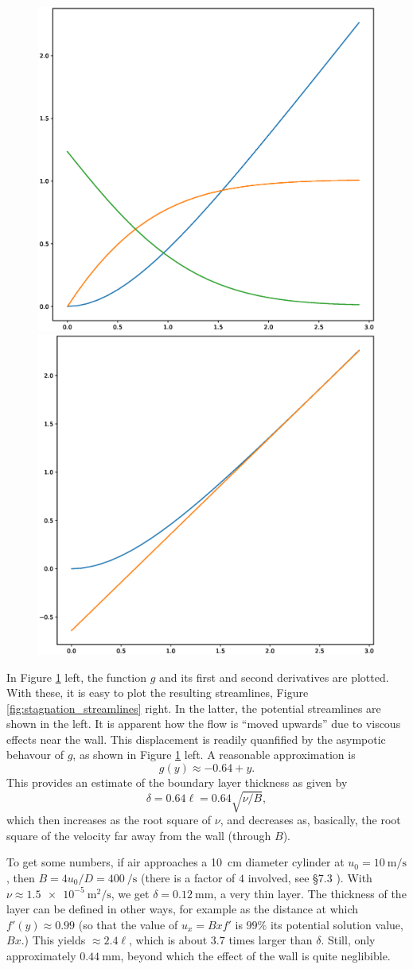 

\begin{figure}
  \centering
  \includegraphics[width=0.4\linewidth]{figures/stagnation_functions}
    \includegraphics[width=0.4\linewidth]{figures/stagnation_function_disp}
  \caption{\label{fig:stagnation_functions}}
\end{figure}


In Figure \ref{fig:stagnation_functions} left, the function $g$ and
its first and second derivatives are plotted. With these, it is easy
to plot the resulting streamlines, Figure
\ref{fig:stagnation_streamlines} right. In the latter, the potential
streamlines are shown in the left. It is apparent how the flow is
``moved upwards'' due to viscous effects near the wall. This
displacement is readily quanfified by the asympotic behavour of $g$,
as shown in Figure \ref{fig:stagnation_functions} left. A reasonable
approximation is
\[
g(y) \approx -0.64 + y .
\]
This provides an estimate of the boundary layer thickness as given
by
\[
\delta = 0.64 \ell =  0.64 \sqrt{\nu/B} ,
\]
which then increases as the root square of $\nu$, and decreases as,
basically, the root square of the velocity far away from the wall
(through $B$).

To get some numbers, if air approaches a \SI{10}{\centi\meter}
diameter cylinder at $u_0=\SI{10}{\meter\per\second}$, then
$B = 4u_0/D =\SI{400}{\per\second}$ (there is a factor of $4$
involved, see \cite{white1991viscous} \S 7.3 ). With
$\nu\approx\SI{1.5e-5}{\meter\squared\per\second}$, we get
$\delta = \SI{0.12}{\milli\meter}$, a very thin layer. The thickness
of the layer can be defined in other ways, for example as the distance
at which $f'(y) \approx 0.99 $ (so that the value of $u_x = B x f'$ is
$99\%$ its potential solution value, $B x$.) This yields
$\approx 2.4 \ell$, which is about $3.7$ times larger than
$\delta$. Still, only approximately $ \SI{0.44}{\milli\meter}$, beyond
which the effect of the wall is quite neglibible.

